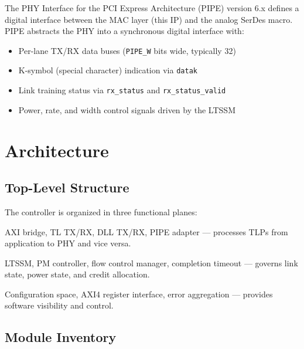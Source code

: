\documentclass[12pt,a4paper]{report}
\begin{document}
The PHY Interface for the PCI Express Architecture (PIPE) version 6.x defines a
digital interface between the MAC layer (this IP) and the analog SerDes macro.
PIPE abstracts the PHY into a synchronous digital interface with:

\begin{itemize}[noitemsep]
  \item Per-lane TX/RX data buses (\texttt{PIPE\_W} bits wide, typically 32)
  \item K-symbol (special character) indication via \texttt{datak}
  \item Link training status via \texttt{rx\_status} and \texttt{rx\_status\_valid}
  \item Power, rate, and width control signals driven by the LTSSM
\end{itemize}

\chapter{Architecture}\label{ch:arch}

\section{Top-Level Structure}

The controller is organized in three functional planes:

\begin{description}[leftmargin=3.5cm,style=nextline]
  \item[Data plane] AXI bridge, TL TX/RX, DLL TX/RX, PIPE adapter — processes
    TLPs from application to PHY and vice versa.
  \item[Control plane] LTSSM, PM controller, flow control manager,
    completion timeout — governs link state, power state, and credit allocation.
  \item[Config plane] Configuration space, AXI4 register interface, error
    aggregation — provides software visibility and control.
\end{description}

\section{Module Inventory}
\end{document}
